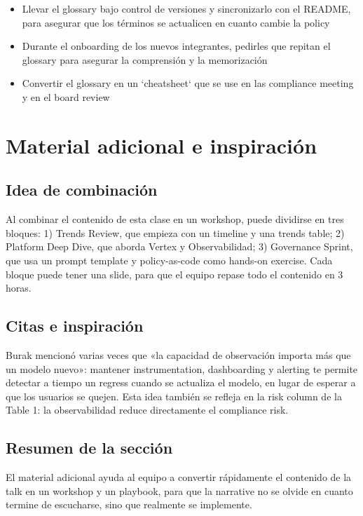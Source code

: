 \documentclass[a4paper]{article}
\begin{document}
\begin{itemize}
    \item Llevar el glossary bajo control de versiones y sincronizarlo con el README, para asegurar que los términos se actualicen en cuanto cambie la policy
    \item Durante el onboarding de los nuevos integrantes, pedirles que repitan el glossary para asegurar la comprensión y la memorización
    \item Convertir el glossary en un `cheatsheet` que se use en las compliance meeting y en el board review
\end{itemize}

\section{Material adicional e inspiración}

\subsection{Idea de combinación}

Al combinar el contenido de esta clase en un workshop, puede dividirse en tres bloques: 1) Trends Review, que empieza con un timeline y una trends table; 2) Platform Deep Dive, que aborda Vertex y Observabilidad; 3) Governance Sprint, que usa un prompt template y policy-as-code como hands-on exercise. Cada bloque puede tener una slide, para que el equipo repase todo el contenido en 3 horas.

\subsection{Citas e inspiración}

Burak mencionó varias veces que «la capacidad de observación importa más que un modelo nuevo»: mantener instrumentation, dashboarding y alerting te permite detectar a tiempo un regress cuando se actualiza el modelo, en lugar de esperar a que los usuarios se quejen. Esta idea también se refleja en la risk column de la Table 1: la observabilidad reduce directamente el compliance risk.

\subsection{Resumen de la sección}

El material adicional ayuda al equipo a convertir rápidamente el contenido de la talk en un workshop y un playbook, para que la narrative no se olvide en cuanto termine de escucharse, sino que realmente se implemente.
\end{document}
